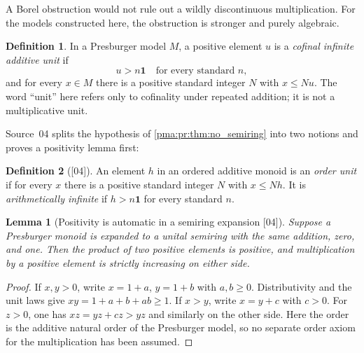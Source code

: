 \documentclass[11pt]{article}
\numberwithin{equation}{section}
\newtheorem{lemma}[lemma]{Lemma}
\theoremstyle{definition}
\newtheorem{definition}[definition]{Definition}
\theoremstyle{remark}
\newcommand{\one}{\mathbf 1}
\newcommand{\src}[1]{\textup{\textsf{\small[#1]}}}
\begin{document}
A Borel obstruction would not rule out a wildly discontinuous
multiplication. For the models constructed here, the obstruction is
stronger and purely algebraic.

\begin{definition}
In a Presburger model $M$, a positive element $u$ is a
\emph{cofinal infinite additive unit} if
\[
 u>n\one\quad\text{for every standard }n,
\]
and for every $x\in M$ there is a positive standard integer $N$ with
$x\leq Nu$.
The word ``unit'' here refers only to cofinality under repeated addition;
it is not a multiplicative unit.
\end{definition}

Source~04 splits the hypothesis of \cref{pma:pr:thm:no_semiring} into two
notions and proves a positivity lemma first:

\begin{definition}[\src{04}]
An element $h$ in an ordered additive monoid is an \emph{order unit} if for
every $x$ there is a positive standard integer $N$ with $x\leq Nh$. It is
\emph{arithmetically infinite} if $h>n\one$ for every standard $n$.
\end{definition}

\begin{lemma}[Positivity is automatic in a semiring expansion \src{04}]
\label{pma:pr:lem:positiveproduct}
Suppose a Presburger monoid is expanded to a unital semiring with the same
addition, zero, and one. Then the product of two positive elements is
positive, and multiplication by a positive element is strictly increasing
on either side.
\end{lemma}

\begin{proof}
If $x,y>0$, write $x=1+a$, $y=1+b$ with $a,b\geq0$. Distributivity and
the unit laws give $xy=1+a+b+ab\geq1$. If $x>y$, write $x=y+c$ with
$c>0$. For $z>0$, one has $xz=yz+cz>yz$ and similarly on the other side.
Here the order is the additive natural order of the Presburger model, so
no separate order axiom for the multiplication has been assumed.
\end{proof}
\end{document}
